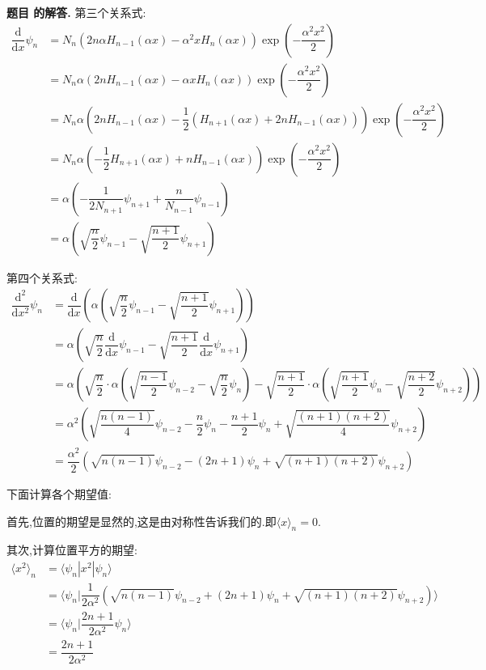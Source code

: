 \documentclass[12pt, a4paper, oneside]{ctexart}
\newcounter{problemname}
\newenvironment{solution}
  {\par\noindent\textbf{题目 \theproblemname 的解答. }}
  {\par}
\begin{document}
\begin{solution}
  第三个关系式:
  \begin{align*}
    \dfrac{\mathrm{d}}{\mathrm{d}x} \psi_n &= N_n \left(2n\alpha H_{n-1}(\alpha x) - \alpha^2 x H_n(\alpha x)\right) \exp\left(-\dfrac{\alpha^2 x^2}{2}\right) \\
    &= N_n \alpha \left(2n H_{n-1}(\alpha x) - \alpha x H_n(\alpha x)\right) \exp\left(-\dfrac{\alpha^2 x^2}{2}\right) \\
    &= N_n \alpha \left(2n H_{n-1}(\alpha x) - \dfrac{1}{2}(H_{n+1}(\alpha x) + 2n H_{n-1}(\alpha x))\right) \exp\left(-\dfrac{\alpha^2 x^2}{2}\right) \\
    &= N_n \alpha \left(-\dfrac{1}{2} H_{n+1}(\alpha x) + n H_{n-1}(\alpha x)\right) \exp\left(-\dfrac{\alpha^2 x^2}{2}\right) \\
    &= \alpha \left(-\dfrac{1}{2N_{n+1}} \psi_{n+1} + \dfrac{n}{N_{n-1}} \psi_{n-1}\right)\\
    &= \alpha (\sqrt{\dfrac{n}{2}} \psi_{n-1} - \sqrt{\dfrac{n+1}{2}} \psi_{n+1})
  \end{align*}

  第四个关系式:
  \begin{align*}
    \dfrac{\mathrm{d}^2}{\mathrm{d}x^2} \psi_n &= \dfrac{\mathrm{d}}{\mathrm{d}x} \left(\alpha (\sqrt{\dfrac{n}{2}} \psi_{n-1} - \sqrt{\dfrac{n+1}{2}} \psi_{n+1})\right) \\
    &= \alpha \left(\sqrt{\dfrac{n}{2}} \dfrac{\mathrm{d}}{\mathrm{d}x} \psi_{n-1} - \sqrt{\dfrac{n+1}{2}} \dfrac{\mathrm{d}}{\mathrm{d}x} \psi_{n+1}\right) \\
    &= \alpha \left(\sqrt{\dfrac{n}{2}} \cdot \alpha (\sqrt{\dfrac{n-1}{2}} \psi_{n-2} - \sqrt{\dfrac{n}{2}} \psi_n) - \sqrt{\dfrac{n+1}{2}} \cdot \alpha (\sqrt{\dfrac{n+1}{2}} \psi_n - \sqrt{\dfrac{n+2}{2}} \psi_{n+2})\right)\\
    &= \alpha^2 \left(\sqrt{\dfrac{n(n-1)}{4}} \psi_{n-2} - \dfrac{n}{2} \psi_n - \dfrac{n+1}{2} \psi_n + \sqrt{\dfrac{(n+1)(n+2)}{4}} \psi_{n+2}\right)\\
    &= \dfrac{\alpha^2}{2} (\sqrt{n(n-1)}\psi_{n-2} - (2n+1)\psi_n + \sqrt{(n+1)(n+2)}\psi_{n+2})
  \end{align*}

  下面计算各个期望值:
  
  首先,位置的期望是显然的,这是由对称性告诉我们的.即$\langle x \rangle_n = 0$.

  其次,计算位置平方的期望:
  \begin{align*}
    \langle x^2 \rangle_n &= \langle \psi_n | x^2 | \psi_n \rangle \\
    &= \langle \psi_n | \dfrac{1}{2\alpha^2} (\sqrt{n(n-1)}\psi_{n-2} + (2n+1)\psi_n + \sqrt{(n+1)(n+2)}\psi_{n+2}) \rangle \\
    &= \langle \psi_n | \dfrac{2n+1}{2\alpha^2} \psi_n \rangle \\
    &= \dfrac{2n+1}{2\alpha^2}
  \end{align*}


\end{solution}
\end{document}
